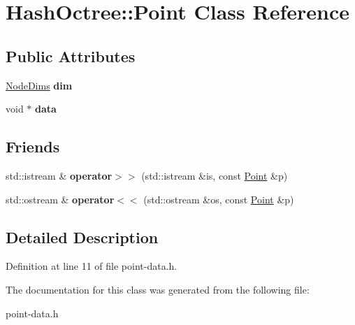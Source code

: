 \hypertarget{class_hash_octree_1_1_point}{}\section{Hash\+Octree\+::Point Class Reference}
\label{class_hash_octree_1_1_point}
\subsection*{Public Attributes}
\begin{DoxyCompactItemize}
\item 
\mbox{\label{class_hash_octree_1_1_point_a25bf5dc109d97354ba1f11c3e3931086}} 
\mbox{\hyperlink{class_hash_octree_1_1_node_dims}{Node\+Dims}} {\bfseries dim}
\item 
\mbox{\label{class_hash_octree_1_1_point_a8151be35caed953482bd7f4b49e226af}} 
void $\ast$ {\bfseries data}
\end{DoxyCompactItemize}
\subsection*{Friends}
\begin{DoxyCompactItemize}
\item 
\mbox{\label{class_hash_octree_1_1_point_ac7c7e29a9e81197fa739bbf8fbfaacec}} 
std\+::istream \& {\bfseries operator$>$$>$} (std\+::istream \&is, const \mbox{\hyperlink{class_hash_octree_1_1_point}{Point}} \&p)
\item 
\mbox{\label{class_hash_octree_1_1_point_aab55cf13db83c55c46a961b2b2441960}} 
std\+::ostream \& {\bfseries operator$<$$<$} (std\+::ostream \&os, const \mbox{\hyperlink{class_hash_octree_1_1_point}{Point}} \&p)
\end{DoxyCompactItemize}


\subsection{Detailed Description}


Definition at line 11 of file point-\/data.\+h.



The documentation for this class was generated from the following file\+:\begin{DoxyCompactItemize}
\item 
point-\/data.\+h\end{DoxyCompactItemize}
